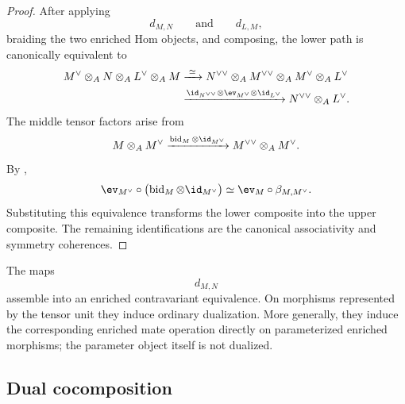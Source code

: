 \begin{proof}
After applying
\[
    d_{M,N}
    \qquad\text{and}\qquad
    d_{L,M},
\]
braiding the two enriched Hom objects, and composing, the lower path is
canonically equivalent to
\[
\begin{aligned}
    M^\vee
    \otimes_A
    N
    \otimes_A
    L^\vee
    \otimes_A
    M
    &\xrightarrow{\;\simeq\;}
    N^{\vee\vee}
    \otimes_A
    M^{\vee\vee}
    \otimes_A
    M^\vee
    \otimes_A
    L^\vee
    \\
    &\xrightarrow{
        \id_{N^{\vee\vee}}
        \otimes
        \ev_{M^\vee}
        \otimes
        \id_{L^\vee}
    }
    N^{\vee\vee}\otimes_A L^\vee.
\end{aligned}
\]
The middle tensor factors arise from
\[
    M\otimes_A M^\vee
    \xrightarrow{
        \operatorname{bid}_M
        \otimes
        \id_{M^\vee}
    }
    M^{\vee\vee}\otimes_A M^\vee.
\]
By
,
\[
    \ev_{M^\vee}
    \circ
    \bigl(
        \operatorname{bid}_M
        \otimes
        \id_{M^\vee}
    \bigr)
    \simeq
    \ev_M
    \circ
    \beta_{M,M^\vee}.
\]
Substituting this equivalence transforms the lower composite into the
upper composite. The remaining identifications are the canonical
associativity and symmetry coherences.
\end{proof}

\begin{remark}
\label{rem:enriched-mate-not-parameter-dual}
The maps
\[
    d_{M,N}
\]
assemble into an enriched contravariant equivalence. On morphisms
represented by the tensor unit they induce ordinary dualization. More
generally, they induce the corresponding enriched mate operation directly
on parameterized enriched morphisms; the parameter object itself is not
dualized.
\end{remark}


\subsection{Dual cocomposition}

